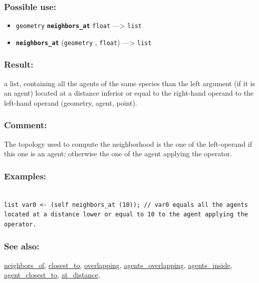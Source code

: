 \documentclass[]{book}
\providecommand{\tightlist}{%
  \setlength{\itemsep}{0pt}\setlength{\parskip}{0pt}}
\theoremstyle{definition}
\theoremstyle{definition}
\theoremstyle{definition}
\theoremstyle{remark}
\begin{document}
\subsubsection{Possible use:}\label{possible-use-366}

\begin{itemize}
\tightlist
\item
  \texttt{geometry} \textbf{\texttt{neighbors\_at}} \texttt{float}
  ---\textgreater{} \texttt{list}
\item
  \textbf{\texttt{neighbors\_at}} (\texttt{geometry} , \texttt{float})
  ---\textgreater{} \texttt{list}
\end{itemize}

\subsubsection{Result:}\label{result-354}

a list, containing all the agents of the same species than the left
argument (if it is an agent) located at a distance inferior or equal to
the right-hand operand to the left-hand operand (geometry, agent,
point).

\subsubsection{Comment:}\label{comment-73}

The topology used to compute the neighborhood is the one of the
left-operand if this one is an agent; otherwise the one of the agent
applying the operator.

\subsubsection{Examples:}\label{examples-253}

\begin{verbatim}
 
list var0 <- (self neighbors_at (10)); // var0 equals all the agents located at a distance lower or equal to 10 to the agent applying the operator.
\end{verbatim}

\subsubsection{See also:}\label{see-also-146}

\href{operators-n-to-r.html\#neighbors_of}{neighbors\_of},
\href{operators-b-to-c.html\#closest_to}{closest\_to},
\href{operators-n-to-r.html\#overlapping}{overlapping},
\href{operators-a-to-a.html\#agents_overlapping}{agents\_overlapping},
\href{operators-a-to-a.html\#agents_inside}{agents\_inside},
\href{operators-a-to-a.html\#agent_closest_to}{agent\_closest\_to},
\href{operators-a-to-a.html\#at_distance}{at\_distance},
\end{document}

